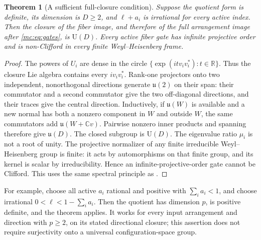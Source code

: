 \documentclass[11pt,a4paper]{article}
\newtheorem{theorem}{Theorem}[section]
\theoremstyle{remark}\newtheorem{remark}[theorem]{Remark}
\newcommand{\U}{\mathrm U}
\newcommand{\C}{\mathbb C}
\begin{document}
\begin{theorem}[A sufficient full-closure condition]\label{mc:thm:dense}
Suppose the quotient form is definite, its dimension is $D\ge2$, and
$\ell+a_i$ is irrational for every active index. Then the closure of
the fiber image, and therefore of the full arrangement image after
\eqref{mc:eq:gates}, is $\U(D)$. Every active fiber gate has infinite
projective order and is non-Clifford in every finite Weyl--Heisenberg frame.
\end{theorem}
\begin{proof}
The powers of $U_i$ are dense in the circle
$\{\exp(itv_iv_i^*):t\in\mathbb R\}$. Thus the closure Lie algebra
contains every $iv_iv_i^*$. Rank-one projectors onto two independent,
nonorthogonal directions generate $\mathfrak u(2)$ on their span:
their commutator and a second commutator give the two off-diagonal
directions, and their traces give the central direction. Inductively,
if $\mathfrak u(W)$ is available and a new normal has both a nonzero
component in $W$ and outside $W$, the same commutators add
$\mathfrak u(W+\C v)$. Pairwise nonzero inner products and spanning
therefore give $\mathfrak u(D)$. The closed subgroup is $\U(D)$.
The eigenvalue ratio $\mu_i$ is not a root of unity. The projective
normalizer of any finite irreducible Weyl--Heisenberg group is finite:
it acts by automorphisms on that finite group, and its kernel is scalar by
irreducibility. Hence an infinite-projective-order gate cannot be Clifford.
This uses the same spectral principle as \cite{NegamiGates}.
\end{proof}

For example, choose all active $a_i$ rational and positive with
$\sum_i a_i<1$, and choose irrational $0<\ell<1-\sum_i a_i$.
Then the quotient has dimension $p$, is positive definite, and the
theorem applies. It works for every input arrangement and direction
with $p\ge2$, on its stated directional closure; this assertion does
not require surjectivity onto a universal configuration-space group.
\end{document}
